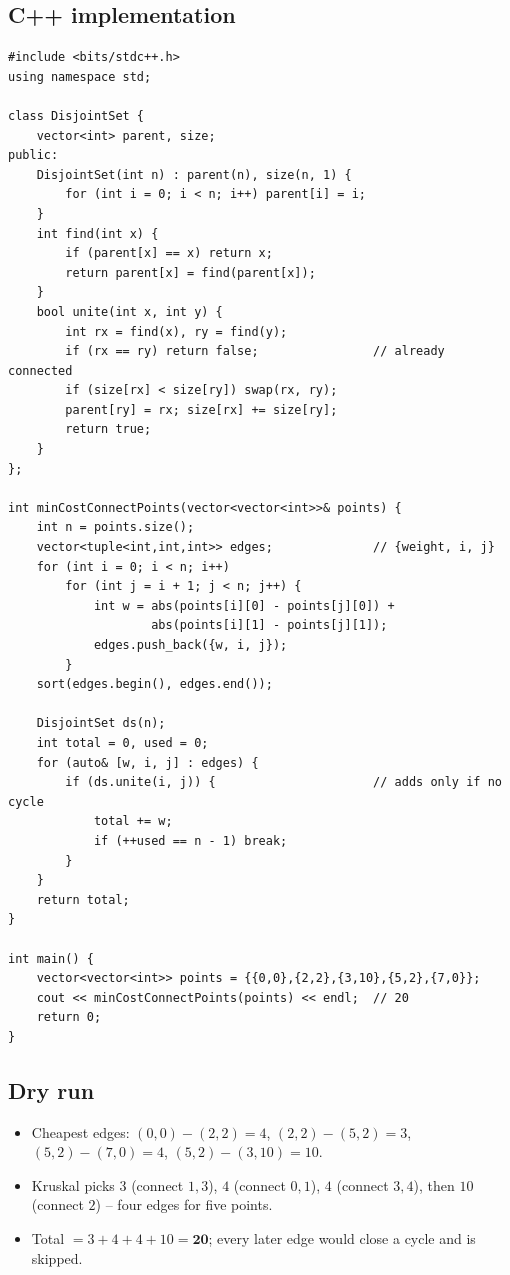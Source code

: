 \subsection*{C++ implementation}

\begin{lstlisting}
#include <bits/stdc++.h>
using namespace std;

class DisjointSet {
    vector<int> parent, size;
public:
    DisjointSet(int n) : parent(n), size(n, 1) {
        for (int i = 0; i < n; i++) parent[i] = i;
    }
    int find(int x) {
        if (parent[x] == x) return x;
        return parent[x] = find(parent[x]);
    }
    bool unite(int x, int y) {
        int rx = find(x), ry = find(y);
        if (rx == ry) return false;                // already connected
        if (size[rx] < size[ry]) swap(rx, ry);
        parent[ry] = rx; size[rx] += size[ry];
        return true;
    }
};

int minCostConnectPoints(vector<vector<int>>& points) {
    int n = points.size();
    vector<tuple<int,int,int>> edges;              // {weight, i, j}
    for (int i = 0; i < n; i++)
        for (int j = i + 1; j < n; j++) {
            int w = abs(points[i][0] - points[j][0]) +
                    abs(points[i][1] - points[j][1]);
            edges.push_back({w, i, j});
        }
    sort(edges.begin(), edges.end());

    DisjointSet ds(n);
    int total = 0, used = 0;
    for (auto& [w, i, j] : edges) {
        if (ds.unite(i, j)) {                      // adds only if no cycle
            total += w;
            if (++used == n - 1) break;
        }
    }
    return total;
}

int main() {
    vector<vector<int>> points = {{0,0},{2,2},{3,10},{5,2},{7,0}};
    cout << minCostConnectPoints(points) << endl;  // 20
    return 0;
}
\end{lstlisting}

\subsection*{Dry run}


\begin{itemize}
  \item Cheapest edges: $(0,0)\!-\!(2,2)=4$, $(2,2)\!-\!(5,2)=3$,
        $(5,2)\!-\!(7,0)=4$, $(5,2)\!-\!(3,10)=10$.
  \item Kruskal picks $3$ (connect $1,3$), $4$ (connect $0,1$), $4$
        (connect $3,4$), then $10$ (connect $2$) -- four edges for five
        points.
  \item Total $=3+4+4+10=\mathbf{20}$; every later edge would close a
        cycle and is skipped.
\end{itemize}

